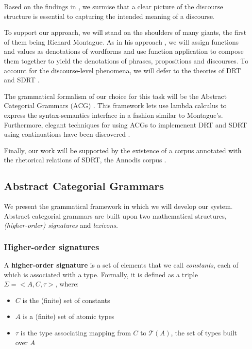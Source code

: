 \documentclass{article}
\begin{document}
Based on the findings in \cite{asher2003logics}, we surmise that a clear
picture of the discourse structure is essential to capturing the
intended meaning of a discourse.

To support our approach, we will stand on the shoulders of many giants,
the first of them being Richard Montague. As in his approach
\cite{montague1973proper}, we will assign functions and values as
denotations of wordforms and use function application to compose them
together to yield the denotations of phrases, propositions and
discourses. To account for the discourse-level phenomena, we will defer
to the theories of DRT \cite{kamp1993discourse} and SDRT
\cite{asher2003logics}.

The grammatical formalism of our choice for this task will be the
Abstract Categorial Grammars (ACG) \cite{de2001towards}. This framework
lets use lambda calculus to express the syntax-semantics interface in a
fashion similar to Montague's. Furthermore, elegant techniques for using
ACGs to implemenent DRT and SDRT using continuations have been
discovered \cite{de2006towards} \cite{asher2011sdrt}
\cite{asher2011montagovian}.

Finally, our work will be supported by the existence of a corpus
annotated with the rhetorical relations of SDRT, the Annodis corpus
\cite{afantenos2012empirical}.


\subsection{Abstract Categorial Grammars}

We present the grammatical framework in which we will develop our
system. Abstract categorial grammars are built upon two mathematical
structures, \emph{(higher-order) signatures} and \emph{lexicons}.

\subsubsection{Higher-order signatures}

A \textbf{higher-order signature} is a set of elements that we call
\emph{constants}, each of which is associated with a type. Formally, it
is defined as a triple $\Sigma = \mathopen{<}A, C, \tau\mathclose{>}$,
where:
\begin{itemize}
  \item $C$ is the (finite) set of constants
  \item $A$ is a (finite) set of atomic types
  \item $\tau$ is the type associating mapping from $C$ to $\mathcal{T}(A)$,
    the set of types built over $A$
\end{itemize}
\end{document}

